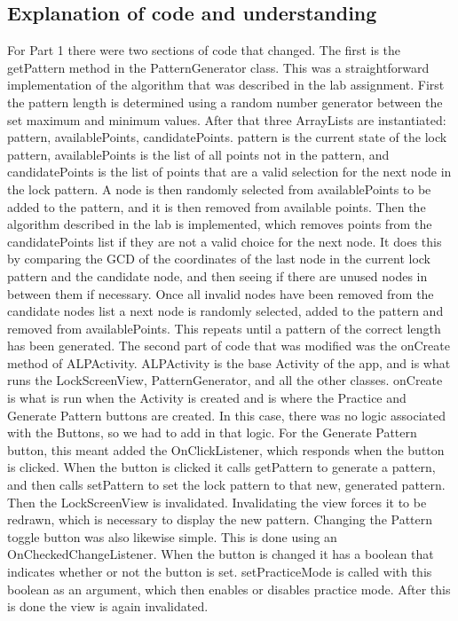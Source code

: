 \documentclass{article}
\begin{document}
\subsection{Explanation of code and understanding} 
For Part 1 there were two sections of code that changed. The first is the getPattern method in the PatternGenerator class. This was a straightforward implementation of the algorithm that was described in the lab assignment. First the pattern length is determined using a
random number generator between the set maximum and minimum values. After that three ArrayLists are instantiated: pattern, availablePoints, candidatePoints. pattern is the current state of the lock pattern, availablePoints is the list
of all points not in the pattern, and candidatePoints is the list of points
that are a valid selection for the next node in the lock pattern. A node is
then randomly selected from availablePoints to be added to the pattern, and it
is then removed from available points. Then the algorithm described in the lab
is implemented, which removes points from the candidatePoints list if they are
not a valid choice for the next node. It does this by comparing the GCD of the
coordinates of the last node in the current lock pattern and the candidate
node, and then seeing if there are unused nodes in between them if necessary.
Once all invalid nodes have been removed from the candidate nodes list a next
node is randomly selected, added to the pattern and removed from
availablePoints. This repeats until a pattern of the correct length has been
generated.  The second part of code that was modified was the onCreate method
of ALPActivity. ALPActivity is the base Activity of the app, and is what runs
the LockScreenView, PatternGenerator, and all the other classes. onCreate is
what is run when the Activity is created and is where the Practice and Generate
Pattern buttons are created. In this case, there was no logic associated with
the Buttons, so we had to add in that logic. For the Generate Pattern button,
this meant added the OnClickListener, which responds when the button is
clicked. When the button is clicked it calls getPattern to generate a pattern,
and then calls setPattern to set the lock pattern to that new, generated
pattern. Then the LockScreenView is invalidated. Invalidating the view forces
it to be redrawn, which is necessary to display the new pattern.  Changing the
Pattern toggle button was also likewise simple. This is done using an
OnCheckedChangeListener. When the button is changed it has a boolean that
indicates whether or not the button is  set. setPracticeMode is called with
this boolean as an argument, which then enables or disables practice mode.
After this is done the view is again invalidated.
\end{document}
